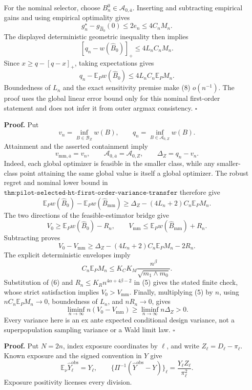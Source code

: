 For the nominal selector, choose \(B_n^0\in\mathcal A_{0,\overline a}\).  Inserting and subtracting empirical gains and using empirical optimality gives
\[
g_n^\star-g_{\widehat B_0}(0)\le2e_n\le4C_nM_n.
\tag{6}
\]
The displayed deterministic geometric inequality then implies
\[
[q_n-w(\widehat B_0)]_+\le4L_nC_nM_n.
\tag{7}
\]
Since \(x\ge q-[q-x]_+\), taking expectations gives
\[
q_n-\mathbb E_Pw(\widehat B_0)\le4L_nC_n\mathbb E_PM_n.
\tag{8}
\]
Boundedness of \(L_n\) and the exact sensitivity premise make (8) \(o(n^{-1})\).  The proof uses the global linear error bound only for this nominal first-order statement and does not infer it from outer argmax consistency. \(\square\)

\textbf{Proof.}
Put
\[
v_n=\inf_{B\in\mathcal B_Z}w(B),
\qquad q_n=\inf_{B\in\mathcal A_{0,Z}}w(B).
\tag{1}
\]
Attainment and the asserted containment imply
\[
v_{\mathrm{mm},\overline a}=v_n,
\qquad
\mathcal A_{0,\overline a}=\mathcal A_{0,Z},
\qquad
\Delta_Z=q_n-v_n.
\tag{2}
\]
Indeed, each global optimizer is feasible in the smaller class, while any smaller-class point attaining the same global value is itself a global optimizer.  The robust regret and nominal lower bound in \(\texttt{thm:pilot-selected-ht-first-order-variance-transfer}\) therefore give
\[
\mathbb E_Pw(\widehat B_0)-\mathbb E_Pw(\widehat B_{\mathrm{mm}})
\ge\Delta_Z-(4L_n+2)C_n\mathbb E_PM_n.
\tag{3}
\]
The two directions of the feasible-estimator bridge give
\[
V_0\ge\mathbb E_Pw(\widehat B_0)-R_n,
\qquad
V_{\mathrm{mm}}\le\mathbb E_Pw(\widehat B_{\mathrm{mm}})+R_n.
\tag{4}
\]
Subtracting proves
\[
V_0-V_{\mathrm{mm}}
\ge\Delta_Z-(4L_n+2)C_n\mathbb E_PM_n-2R_n.
\tag{5}
\]
The explicit deterministic envelopes imply
\[
C_n\mathbb E_PM_n\le K_CK_M\frac{n^\beta}{\sqrt{m_1\wedge m_0}}.
\tag{6}
\]
Substitution of (6) and \(R_n\le K_Rn^{4\alpha+4\beta-2}\) in (5) gives the stated finite check, whose strict satisfaction implies \(V_0>V_{\mathrm{mm}}\).  Finally, multiplying (5) by \(n\), using \(nC_n\mathbb E_PM_n\to0\), boundedness of \(L_n\), and \(nR_n\to0\), gives
\[
\liminf_{n\to\infty}n(V_0-V_{\mathrm{mm}})
\ge\liminf_{n\to\infty}n\Delta_Z>0.
\]
Every variance here is an ex ante expected conditional design variance, not a superpopulation sampling variance or a Wald limit law. \(\square\)

\textbf{Proof.}
Put \(N=2n\), index exposure coordinates by \(\ell\), and write \(Z_\ell=D_\ell-\pi_\ell\).  Known exposure and the signed convention in \(Y\) give
\[
\mathbb E_\nu\widehat Y_\ell^{\mathrm{obs}}=Y_\ell,
\qquad
\{\Pi^{-1}(\widehat Y^{\mathrm{obs}}-Y)\}_\ell
=\frac{Y_\ell Z_\ell}{\pi_\ell^2}.
\tag{1}
\]
Exposure positivity licenses every division.

